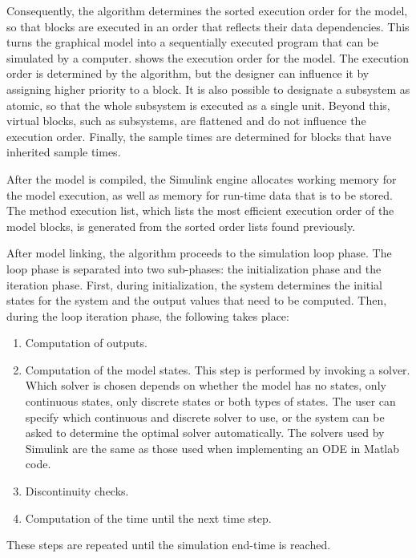 \documentclass[\rootfolder/main.tex]{subfiles}
\begin{document}
Consequently, the algorithm determines the sorted execution order for the model, so that blocks are executed in an order that reflects their data dependencies.
This turns the graphical model into a sequentially executed program that can be simulated by a computer.
 shows the execution order for the model.
The execution order is determined by the algorithm, but the designer can influence it by assigning higher priority to a block.
It is also possible to designate a subsystem as atomic, so that the whole subsystem is executed as a single unit.
Beyond this, virtual blocks, such as subsystems, are flattened and do not influence the execution order.
Finally, the sample times are determined for blocks that have inherited sample times.

After the model is compiled, the Simulink engine allocates working memory for the model execution, as well as memory for run-time data that is to be stored.
The method execution list, which lists the most efficient execution order of the model blocks, is generated from the sorted order lists found previously.

After model linking, the algorithm proceeds to the simulation loop phase.
The loop phase is separated into two sub-phases: the initialization phase and the iteration phase.
First, during initialization, the system determines the initial states for the system and the output values that need to be computed.
Then, during the loop iteration phase, the following takes place:

\begin{enumerate}
    \item Computation of outputs.
    \item Computation of the model states.
        This step is performed by invoking a solver.
        Which solver is chosen depends on whether the model has no states, only continuous states, only discrete states or both types of states.
        The user can specify which continuous and discrete solver to use, or the system can be asked to determine the optimal solver automatically.
        The solvers used by Simulink are the same as those used when implementing an ODE in Matlab code.
    \item Discontinuity checks.
    \item Computation of the time until the next time step.
\end{enumerate}

These steps are repeated until the simulation end-time is reached.
\end{document}
